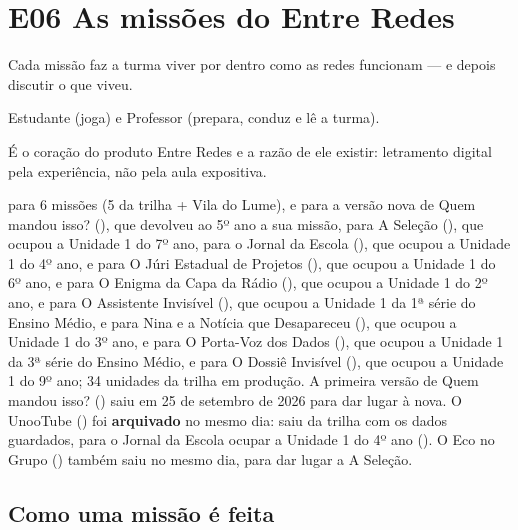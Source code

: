 \chapter{E06 \textperiodcentered{} As missões do Entre Redes}
\label{ep:e06}

\begin{fichaepico}
\begin{campos}
  \item[Objetivo] Cada missão faz a turma viver por dentro como as redes
    funcionam --- e depois discutir o que viveu.
  \item[Para quem] Estudante (joga) e Professor (prepara, conduz e lê a
    turma).
  \item[Valor] É o coração do produto Entre Redes e a razão de ele existir:
    letramento digital pela experiência, não pela aula expositiva.
  \item[Estado] \pronto{} para 6 missões (5 da trilha + Vila do Lume), e
    \parcial{} para a versão nova de Quem mandou isso? (), que
    devolveu ao 5º ano a sua missão, para A Seleção (), que
    ocupou a Unidade 1 do 7º ano, para o Jornal da Escola (),
    que ocupou a Unidade 1 do 4º ano, e para O Júri Estadual de Projetos
    (), que ocupou a Unidade 1 do 6º ano, e para O Enigma da Capa
    da Rádio (), que ocupou a Unidade 1 do 2º ano, e para O
    Assistente Invisível (), que ocupou a Unidade 1 da 1ª série do
    Ensino Médio, e para Nina e a Notícia que Desapareceu (), que
    ocupou a Unidade 1 do 3º ano, e para O Porta-Voz dos Dados (), que
    ocupou a Unidade 1 da 3ª série do Ensino Médio, e para O Dossiê Invisível
    (), que ocupou a Unidade 1 do 9º ano; 34 unidades da trilha em
    produção. A
    primeira versão de Quem mandou isso? () saiu em 25 de setembro de
    2026 para dar lugar à nova. O UnooTube () foi \textbf{arquivado}
    no mesmo dia: saiu da trilha com os dados guardados, para o Jornal da Escola
    ocupar a Unidade 1 do 4º ano (). O Eco no Grupo ()
    também saiu no mesmo dia, para dar lugar a A Seleção.
\end{campos}
\end{fichaepico}

\section{Como uma missão é feita}

